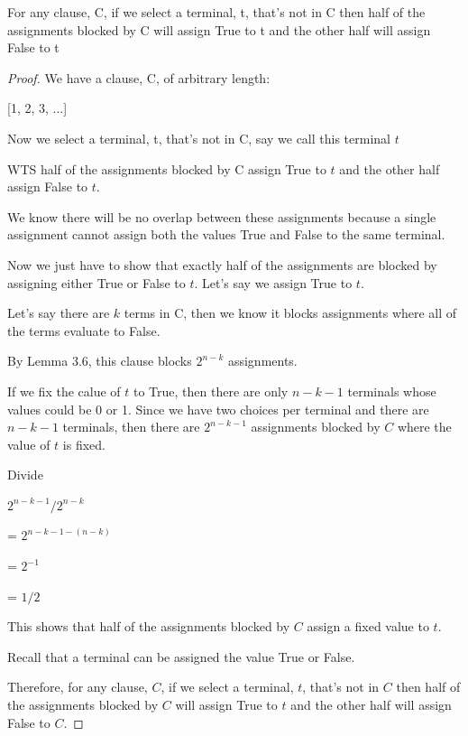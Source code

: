 \documentclass[manuscript]{acmart}
\begin{document}
    \begin{lemma}
        For any clause, C, if we select a terminal, t, that's not in C then half of the assignments
        blocked by C will assign True to t and the other half will assign False to t
    \end{lemma}
    \begin{proof}
        We have a clause, C, of arbitrary length:

        [1, 2, 3, ...]

        Now we select a terminal, t, that's not in C, say we call this terminal $t$

        WTS half of the assignments blocked by C assign True to $t$ and the other half
        assign False to $t$.

        We know there will be no overlap between these assignments because a single assignment
        cannot assign both the values True and False to the same terminal.

        Now we just have to show that exactly half of the assignments are blocked by assigning
        either True or False to $t$. Let's say we assign True to $t$.

        Let's say there are $k$ terms in C, then we know it blocks assignments where
        all of the terms evaluate to False.

        By Lemma 3.6, this clause blocks $2^{n-k}$ assignments. 

        If we fix the calue of $t$ to True, then there are only $n-k-1$ terminals
        whose values could be 0 or 1. Since we have two choices per terminal
        and there are $n-k-1$ terminals, then there are $2^{n-k-1}$ assignments
        blocked by $C$ where the value of $t$ is fixed.

        Divide 
        
        $2^{n-k-1}/2^{n-k}$

        = $2^{n - k - 1 - (n - k)}$

        = $2^{-1}$

        = $1/2$

        This shows that half of the assignments blocked by $C$ assign a fixed
        value to $t$.

        Recall that a terminal can be assigned the value True or False.

        Therefore, for any clause, $C$, if we select a terminal, $t$, that's not
        in $C$ then half of the assignments blocked by $C$ will assign True
        to $t$ and the other half will assign False to $C$.

    \end{proof}
\end{document}
